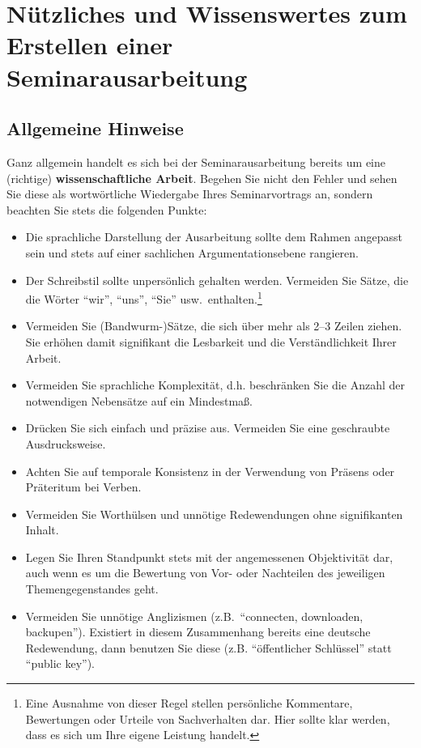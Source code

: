 %
\section{Nützliches und Wissenswertes zum Erstellen einer Seminarausarbeitung}
\label{sec_stil}

\subsection{Allgemeine Hinweise}
Ganz allgemein handelt es sich bei der Seminarausarbeitung bereits um eine (richtige) {\bf wissenschaftliche Arbeit}.
Begehen Sie nicht den Fehler und sehen Sie diese als wortwörtliche Wiedergabe Ihres Seminarvortrags an, sondern beachten Sie stets die folgenden Punkte:
\begin{itemize}
\item Die sprachliche Darstellung der Ausarbeitung sollte dem Rahmen angepasst sein und stets auf einer sachlichen Argumentationsebene rangieren.
\item Der Schreibstil sollte unpersönlich gehalten werden. 
Vermeiden Sie Sätze, die die Wörter "`wir"', "`uns"', "`Sie"' usw.~enthalten.\footnote{Eine Ausnahme von dieser Regel stellen persönliche Kommentare, Bewertungen oder Urteile von Sachverhalten dar. Hier sollte klar werden, dass es sich um Ihre eigene Leistung handelt.}
\item Vermeiden Sie (Bandwurm-)Sätze, die sich über mehr als 2--3 Zeilen ziehen. Sie erhöhen damit signifikant die Lesbarkeit und die Verständlichkeit  Ihrer Arbeit.
\item Vermeiden Sie sprachliche Komplexität, d.h. beschränken Sie die Anzahl der notwendigen Nebensätze auf ein Mindestmaß.
\item Drücken Sie sich einfach und präzise aus. Vermeiden Sie eine \glqq geschraubte\grqq\, Ausdrucksweise.
\item Achten Sie auf temporale Konsistenz in der Verwendung von Präsens oder Präteritum  bei Verben.
\item Vermeiden Sie Worthülsen und unnötige Redewendungen ohne signifikanten Inhalt. 
\item Legen Sie Ihren Standpunkt stets mit der angemessenen Objektivität dar, auch wenn es um die Bewertung von Vor- oder Nachteilen des jeweiligen Themengegenstandes geht.
\item Vermeiden Sie unnötige Anglizismen (z.B.~"`connecten, downloaden, backupen"').
Existiert in diesem Zusammenhang bereits eine deutsche Redewendung, dann benutzen Sie diese (z.B. "`öffentlicher Schlüssel"' statt "`public key"').

\end{itemize}
